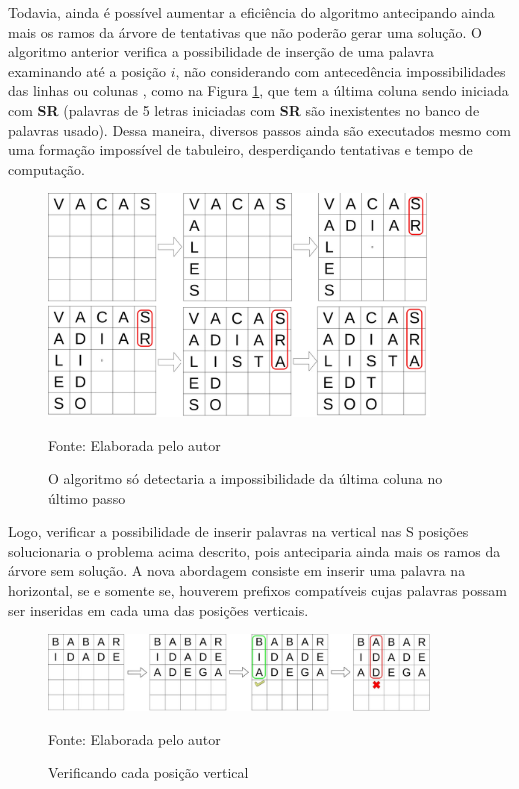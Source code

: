 
Todavia, ainda é possível aumentar a eficiência do algoritmo antecipando ainda mais os ramos da árvore de tentativas que não poderão gerar uma solução. O algoritmo anterior verifica a possibilidade de inserção de uma palavra examinando até a posição $i$, não considerando com antecedência impossibilidades das linhas ou colunas , como na Figura \ref{fig:scaffolding}, que tem a última coluna sendo iniciada com \textbf{SR} (palavras de 5 letras iniciadas com \textbf{SR} são inexistentes no banco de palavras usado). Dessa maneira, diversos passos ainda são executados mesmo com uma formação impossível de tabuleiro, desperdiçando tentativas e tempo de computação.


\begin{figure}[H]
\centering
    \caption{O algoritmo só detectaria a impossibilidade da última coluna no último passo}
    \label{fig:scaffolding}
    \includegraphics[width=0.9\textwidth]{Figuras/bradingerror.jpg}
    
    Fonte: Elaborada pelo autor
\end{figure}

Logo, verificar a possibilidade de inserir palavras na vertical nas S posições solucionaria o problema acima descrito, pois anteciparia ainda mais os ramos da árvore sem solução. A nova abordagem consiste em inserir uma palavra na horizontal, se e somente se, houverem prefixos compatíveis cujas palavras possam ser inseridas em cada uma das posições verticais.

\begin{figure}[H]
\centering
    \caption{Verificando cada posição vertical}
    \label{fig:scaffoldingcool}
    \includegraphics[width=0.9\textwidth]{Figuras/scaffoldingcool.jpg}
    
    Fonte: Elaborada pelo autor
\end{figure}

